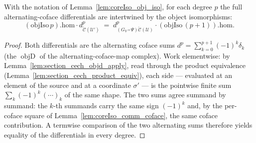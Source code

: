 \begin{lemma}
  \label{lem:coreIso_comm_sum}
  With the notation of Lemma~\ref{lem:coreIso_obj_iso}, for each degree \(p\) the full
  alternating-coface differentials are intertwined by the object isomorphisms:
  \[
    (\mathrm{objIso}\,p).\mathrm{hom} \cdot d^p_{\check{\mathcal{C}}(\mathcal{U}')}
      \;=\;
    d^p_{(G_V\circ\Psi)\check{\mathcal{C}}(\mathcal{U})} \cdot (\mathrm{objIso}\,(p+1)).\mathrm{hom}.
  \]
\end{lemma}
\begin{proof}
  Both differentials are the alternating coface sums \(d^p = \sum_{k=0}^{p+1} (-1)^k
  \delta_k\) (the \(\operatorname{objD}\) of the alternating-coface-map complex). Work
  elementwise: by Lemma~\ref{lem:section_cech_objd_apply}, read through the product equivalence
  (Lemma~\ref{lem:section_cech_product_equiv}), each side — evaluated at an element of the source
  and at a coordinate \(\sigma'\) — is the pointwise finite sum \(\sum_{k} (-1)^k\,(\cdots)_k\) of
  the same shape. The two sums agree summand by summand: the \(k\)-th summands carry the same sign
  \((-1)^k\) and, by the per-coface square of Lemma~\ref{lem:coreIso_comm_coface}, the same coface
  contribution. A termwise comparison of the two alternating sums therefore yields equality of
  the differentials in every degree.
\end{proof}

